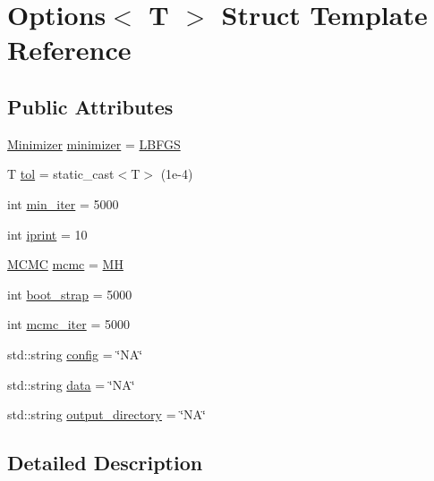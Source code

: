 \hypertarget{struct_options}{\section{Options$<$ T $>$ Struct Template Reference}
\label{struct_options}
}
\subsection*{Public Attributes}
\begin{DoxyCompactItemize}
\item 
\hyperlink{main_8cpp_a85135cb2967cc1e21d0e2e96b125c071}{Minimizer} \hyperlink{struct_options_ab1527f6ea213b470e60f0bfb673e6626}{minimizer} = \hyperlink{main_8cpp_a85135cb2967cc1e21d0e2e96b125c071a8aa2d5dcc79c3457a8be44efe68348ad}{L\-B\-F\-G\-S}
\item 
T \hyperlink{struct_options_ac2dba4b15b871ca36825ec4c2fc38753}{tol} = static\-\_\-cast$<$T$>$ (1e-\/4)
\item 
int \hyperlink{struct_options_a38be912695cadd656ec4638440eb452e}{min\-\_\-iter} = 5000
\item 
int \hyperlink{struct_options_a65ca6536c995fd09207c19b26d6a657f}{iprint} = 10
\item 
\hyperlink{main_8cpp_a92d0159edd3899a97773bf080589435c}{M\-C\-M\-C} \hyperlink{struct_options_a658501e489501c4ce7c139257ee57d93}{mcmc} = \hyperlink{main_8cpp_a92d0159edd3899a97773bf080589435ca79bc3feff3a4c676991ac57a8e9764ab}{M\-H}
\item 
int \hyperlink{struct_options_a40e40c4cbdb83403f52dbecc0fe07749}{boot\-\_\-strap} = 5000
\item 
int \hyperlink{struct_options_a5f067cf738d25bcd5babfcfa5b109509}{mcmc\-\_\-iter} = 5000
\item 
std\-::string \hyperlink{struct_options_a1ac9c3e29359a31236632434946f379c}{config} = \char`\"{}N\-A\char`\"{}
\item 
std\-::string \hyperlink{struct_options_af07888a17b99d02ba62574edc34ccaee}{data} = \char`\"{}N\-A\char`\"{}
\item 
std\-::string \hyperlink{struct_options_ac0336cacd551ef3176e4e133a179fb8b}{output\-\_\-directory} = \char`\"{}N\-A\char`\"{}
\end{DoxyCompactItemize}


\subsection{Detailed Description}
